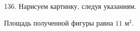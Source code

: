 136. Нарисуем картинку, следуя указаниям.
\begin{center}
\begin{figure}[ht!]
\end{figure}
\end{center}
Площадь полученной фигуры равна $11\text{ м}^2.$\\
